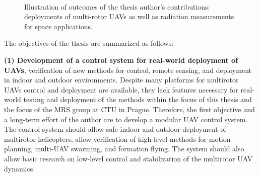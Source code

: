 \documentclass[a4paper,11pt,titlepage,twoside]{book}
\begin{document}
\begin{figure}[!htb]
{  }\\
  \vspace{-0.3em}
  \caption{Illustration of outcomes of the thesis author's contributions: deployments of multi-rotor \acp{UAV} as well as radiation measurements for space applications.}
  \label{fig:collage}
\end{figure}


The objectives of the thesis are summarized as follows:

\textbf{(1) Development of a control system for real-world deployment of \acp{UAV}}, verification of new methods for control, remote sensing, and deployment in indoor and outdoor environments.
Despite many platforms for multirotor \acp{UAV} control and deployment are available, they lack features necessary for real-world testing and deployment of the methods within the focus of this thesis and the focus of the \acl{MRS} group at \ac{CTU} in Prague.
Therefore, the first objective and a long-term effort of the author are to develop a modular \ac{UAV} control system.
The control system should allow safe indoor and outdoor deployment of multirotor helicopters, allow verification of high-level methods for motion planning, multi-\ac{UAV} swarming, and formation flying.
The system should also allow basic research on low-level control and stabilization of the multirotor \ac{UAV} dynamics.
\end{document}
